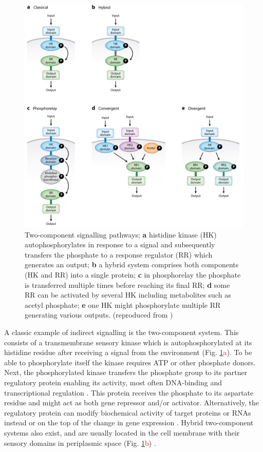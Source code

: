 \begin{figure}[ht!]
  \centering
  \includegraphics[scale=0.8]{text/Pictures/TwoComponent.jpeg}
    \caption{Two-component signalling pathways; \textbf{a} histidine kinase (HK) autophosphorylates in response to a signal and subsequently transfers the phosphate to a response regulator (RR) which generates an output; \textbf{b} a hybrid system comprises both components (HK and RR) into a single protein; \textbf{c} in phosphorelay the phosphate is transferred multiple times before reaching its final RR; \textbf{d} some RR can be activated by several HK including metabolites such as acetyl phosphate; \textbf{e} one HK might phosphorylate multiple RR generating various outputs. (reproduced from \cite{groisman2016feedback})}
    \label{two}
\end{figure}

A classic example of indirect signalling is the two-component system.
This consists of a transmembrane sensory kinase which is autophosphorylated at its histidine residue after receiving a signal from the environment (Fig. \ref{two}\textcolor{red}{a}).
To be able to phosphorylate itself the kinase requires ATP or other phosphate donors.
Next, the phosphorylated kinase transfers the phosphate group to its partner regulatory protein enabling its activity, most often DNA-binding and transcriptional regulation \cite{lynch2012prioritization, gao2015temporal, cui2018novel}.
This protein receives the phosphate to its aspartate residue and might act as both gene repressor and/or activator.
Alternatively, the regulatory protein can modify biochemical activity of target proteins or RNAs instead or on the top of the change in gene expression \cite{shu2002antar, chambonnier2016hybrid}.
Hybrid two-component systems also exist, and are usually located in the cell membrane with their sensory domains in periplasmic space (Fig. \ref{two}\textcolor{red}{b}) \cite{lynch2012prioritization, hirano2013regulon}.

